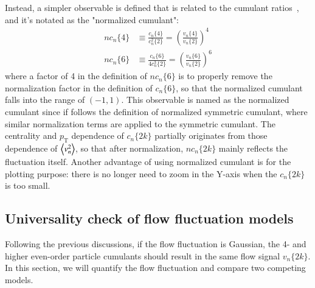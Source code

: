 Instead, a simpler observable is defined that is related to the cumulant ratios~\cite{Sirunyan:2017fts}, and it's notated as the "normalized cumulant":
\begin{equation}
\begin{split}
nc_n\{4\}&\equiv\frac{c_n\{4\}}{c_n^2\{2\}} = (\frac{v_n\{4\}}{v_n\{2\}})^4 \\
nc_n\{6\}&\equiv\frac{c_n\{6\}}{4c_n^3\{2\}} = (\frac{v_n\{6\}}{v_n\{2\}})^6
\end{split}
\end{equation}
where a factor of 4 in the definition of $nc_n\{6\}$ is to properly remove the normalization factor in the definition of $c_n\{6\}$, so that the normalized cumulant falls into the range of $(-1,1)$. This observable is named as the normalized cumulant since if follows the definition of normalized symmetric cumulant, where similar normalization terms are applied to the symmetric cumulant. The centrality and $p_\text{T}$ dependence of $c_n\{2k\}$ partially originates from those dependence of $\left\langle v_n^2\right\rangle$, so that after normalization, $nc_n\{2k\}$ mainly reflects the fluctuation itself. Another advantage of using normalized cumulant is for the plotting purpose: there is no longer need to zoom in the Y-axis when the $c_{n}\{2k\}$ is too small.



\subsection{Universality check of flow fluctuation models}
Following the previous discussions, if the flow fluctuation is Gaussian, the 4- and higher even-order particle cumulants should result in the same flow signal $v_{n}\{2k\}$. In this section, we will quantify the flow fluctuation and compare two competing models.~\cite{Yan:2013laa}

